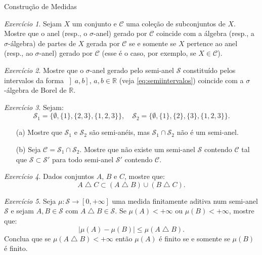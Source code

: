 \documentclass[oneside,final,11pt]{amsbook}
\newcommand{\R}{\mathds R}
\theoremstyle{remark}\newtheorem{exercise}{Exercício}[chapter]
\theoremstyle{remark}\newtheorem{*exercise}[exercise]{\hbox to 0pt{\hskip 0pt minus 1fil*}Exercício}
\theoremstyle{definition}\newtheorem{exdefin}{Definição}[chapter]
\theoremstyle{plain}\newtheorem{teo}{Teorema}[section]
\theoremstyle{plain}\newtheorem{lem}[teo]{Lema}
\theoremstyle{plain}\newtheorem{prop}[teo]{Proposição}
\theoremstyle{plain}\newtheorem{cor}[teo]{Corolário}
\theoremstyle{definition}\newtheorem{defin}[teo]{Definição}
\theoremstyle{remark}\newtheorem{rem}[teo]{Observação}
\theoremstyle{definition}\newtheorem{notation}[teo]{Notação}
\theoremstyle{definition}\newtheorem{convention}[teo]{Convenção}
\theoremstyle{definition}\newtheorem{example}[teo]{Exemplo}
\numberwithin{section}{chapter}
\numberwithin{equation}{section}
\begin{document}
\begin{chapter}{Construção de Medidas}
\begin{exercise}\label{exe:anelalgerada}
Sejam $X$ um conjunto e $\mathcal C$ uma coleção de subconjuntos de $X$. Mostre
que o anel (resp., o $\sigma$-anel) gerado por $\mathcal C$ coincide com a álgebra
(resp., a $\sigma$-álgebra) de partes de $X$ gerada por $\mathcal C$ se e somente se
$X$ pertence ao anel (resp., ao $\sigma$-anel) gerado por $\mathcal C$ (esse é o caso,
por exemplo, se $X\in\mathcal C$).
\end{exercise}

\begin{exercise}\label{exe:anelBorelint}
Mostre que o $\sigma$-anel gerado pelo semi-anel $\mathcal S$ constituído pelos intervalos da forma
$\left]a,b\right]$, $a,b\in\R$ (veja \eqref{eq:semiintervalos}) coincide com a $\sigma$-álgebra de Borel de $\R$.
\end{exercise}

\begin{exercise}\label{exe:naosemianelgera}
Sejam:
\[\mathcal S_1=\big\{\emptyset,\{1\},\{2,3\},\{1,2,3\}\big\},\quad
\mathcal S_2=\big\{\emptyset,\{1\},\{2\},\{3\},\{1,2,3\}\big\}.\]
\begin{itemize}
\item[(a)] Mostre que $\mathcal S_1$ e $\mathcal S_2$ são semi-anéis, mas $\mathcal S_1\cap\mathcal S_2$ não é
um semi-anel.
\item[(b)] Seja $\mathcal C=\mathcal S_1\cap\mathcal S_2$. Mostre que não existe um semi-anel $\mathcal S$
contendo $\mathcal C$ tal que $\mathcal S\subset\mathcal S'$ para todo semi-anel $\mathcal S'$ contendo
$\mathcal C$.
\end{itemize}
\end{exercise}

\begin{exercise}\label{exe:destriangle}
Dados conjuntos $A$, $B$ e $C$, mostre que:
\[A\bigtriangleup C\subset(A\bigtriangleup B)\cup(B\bigtriangleup C).\]
\end{exercise}

\begin{exercise}\label{exe:mudifsym}
Seja $\mu:\mathcal S\to[0,+\infty]$ uma medida finitamente aditiva num semi-anel $\mathcal S$
e sejam $A,B\in\mathcal S$ com $A\bigtriangleup B\in\mathcal S$. Se $\mu(A)<+\infty$ ou $\mu(B)<+\infty$,
mostre que:
\[\big\vert\mu(A)-\mu(B)\big\vert\le\mu(A\bigtriangleup B).\]
Conclua que se $\mu(A\bigtriangleup B)<+\infty$ então $\mu(A)$ é finito se e somente se
$\mu(B)$ é finito.
\end{exercise}


\end{chapter}
\end{document}
